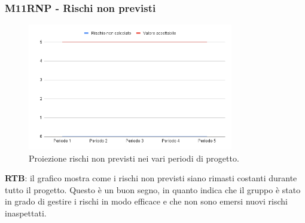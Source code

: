 \subsubsection{M11RNP - Rischi non previsti}
\begin{figure}[H]
    \centering
    \includegraphics[width=0.8\textwidth]{../Images/PianoDiQualifica/M11RNP.png}
    \caption{Proiezione rischi non previsti nei vari periodi di progetto.}
    \label{fig:7}
\end{figure}

\textbf{RTB}: il grafico mostra come i rischi non previsti siano rimasti costanti durante tutto il progetto. Questo è un buon segno, in quanto indica che il gruppo è stato in grado di gestire i rischi in modo efficace e che non sono emersi nuovi rischi inaspettati.
